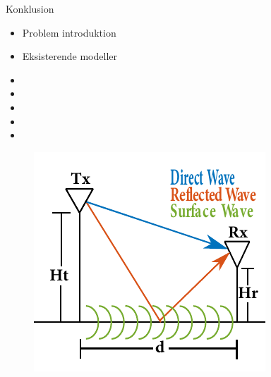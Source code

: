 \begin{frame}{Konklusion}
	\begin{minipage}{0.5\textwidth}
		\begin{itemize}
		\item Problem introduktion
		\item Eksisterende modeller
		\item[] 
		\item[] 
		\item[] 
		\item[] 
		\item[] 
		\end{itemize}
	\end{minipage}%
	\begin{minipage}{0.5\textwidth}
		\begin{figure}[H]
			\centering
			\includegraphics[width=\columnwidth]{figures/poster_cropped_1.pdf}
		\end{figure}
	\end{minipage}%
\end{frame}

